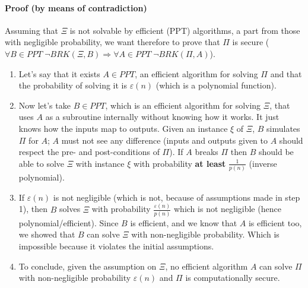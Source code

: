 \documentclass[../main]{subfiles}
\begin{document}
\paragraph{Proof (by means of contradiction)}
Assuming that $\Xi$ is not solvable by efficient (PPT) algorithms, a part from those with negligible probability, we want therefore to prove that $\Pi$ is secure ($\forall{} B \in{} PPT \; \neg BRK(\Xi, B) \Rightarrow{} \forall{} A \in{} PPT \; \neg BRK(\Pi, A)$).\\
\begin{enumerate}
    \item Let's say that it exists $A \in PPT$, an efficient algorithm for solving $\Pi$ and that the probability of solving it is $\varepsilon(n)$ (which is a polynomial function).
    \item Now let's take $B \in{} PPT$, which is an efficient algorithm for solving $\Xi$, that uses $A$ as a subroutine internally without knowing how it works.
    It just knows how the inputs map to outputs. Given an instance $\xi$ of $\Xi$, $B$ simulates $\Pi$ for $A$; $A$ must not see any difference (inputs and outputs given to $A$ should respect the pre- and post-conditions of $\Pi$).
    If $A$ breaks $\Pi$ then $B$ should be able to solve $\Xi$ with instance $\xi$ with probability \textbf{at least} $\frac{1}{p(n)}$ (inverse polynomial).
    \item If $\varepsilon(n)$ is not negligible (which is not, because of assumptions made in step 1), then $B$ solves $\Xi$ with probability $\frac{\varepsilon(n)}{p(n)}$ which is not negligible (hence polynomial/efficient).
    Since $B$ is efficient, and we know that $A$ is efficient too, we showed that $B$ can solve $\Xi$ with non-negligible probability. Which is impossible because it violates the initial assumptions.
    \item To conclude, given the assumption on $\Xi$, no efficient algorithm $A$ can solve $\Pi$ with non-negligible probability $\varepsilon(n)$ and $\Pi$ is computationally secure. 
\end{enumerate}
\end{document}
